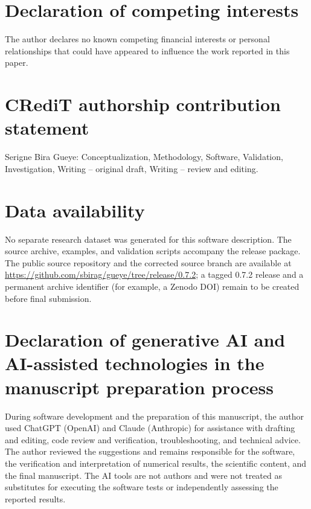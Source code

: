 \documentclass[preprint,12pt,a4paper]{elsarticle}
\begin{document}
\section*{Declaration of competing interests}
The author declares no known competing financial interests or personal relationships that could have appeared to influence the work reported in this paper.

\section*{CRediT authorship contribution statement}
Serigne Bira Gueye: Conceptualization, Methodology, Software, Validation, Investigation, Writing -- original draft, Writing -- review and editing.

\section*{Data availability}
No separate research dataset was generated for this software description. The source archive, examples, and validation scripts accompany the release package. The public source repository and the corrected source branch are available at \url{https://github.com/sbirag/gueye/tree/release/0.7.2}; a tagged 0.7.2 release and a permanent archive identifier (for example, a Zenodo DOI) remain to be created before final submission.

\section*{Declaration of generative AI and AI-assisted technologies in the manuscript preparation process}
During software development and the preparation of this manuscript, the author used ChatGPT (OpenAI) and Claude (Anthropic) for assistance with drafting and editing, code review and verification, troubleshooting, and technical advice. The author reviewed the suggestions and remains responsible for the software, the verification and interpretation of numerical results, the scientific content, and the final manuscript. The AI tools are not authors and were not treated as substitutes for executing the software tests or independently assessing the reported results.
\end{document}
